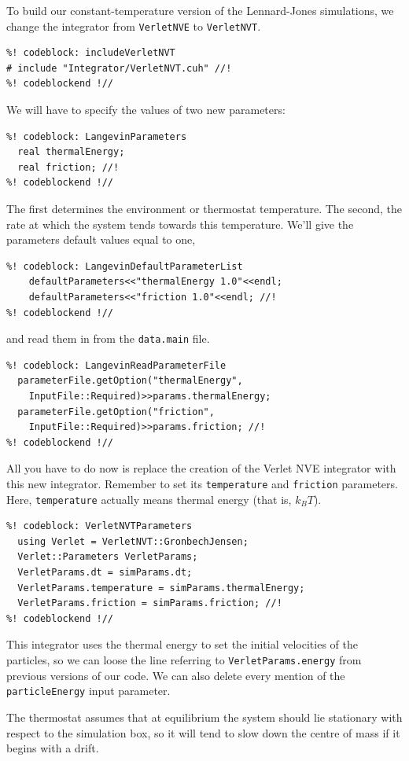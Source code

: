 To build our constant-temperature version of the Lennard-Jones simulations, we 
change the integrator from \texttt{VerletNVE} to \texttt{VerletNVT}.
\begin{lstlisting}
%! codeblock: includeVerletNVT
# include "Integrator/VerletNVT.cuh" //!
%! codeblockend !//
\end{lstlisting}
We will have to specify the values of two new parameters:
\begin{lstlisting}
%! codeblock: LangevinParameters
  real thermalEnergy;
  real friction; //!
%! codeblockend !//
\end{lstlisting}
The first determines the environment or thermostat temperature. The second, 
the rate at which the system tends towards this temperature. We'll give the 
parameters default values equal to one,
\begin{lstlisting}
%! codeblock: LangevinDefaultParameterList
    defaultParameters<<"thermalEnergy 1.0"<<endl;
    defaultParameters<<"friction 1.0"<<endl; //!
%! codeblockend !//
\end{lstlisting}
and read them in from the \texttt{data.main} file.
\begin{lstlisting}
%! codeblock: LangevinReadParameterFile
  parameterFile.getOption("thermalEnergy",
    InputFile::Required)>>params.thermalEnergy;
  parameterFile.getOption("friction",
    InputFile::Required)>>params.friction; //!
%! codeblockend !//
\end{lstlisting}

All you have to do now is replace the creation of the Verlet NVE integrator with 
this new integrator. Remember to set its \texttt{temperature} and 
\texttt{friction} parameters. Here, \texttt{temperature} actually means thermal 
energy (that is, $k_BT$).
\begin{lstlisting}
%! codeblock: VerletNVTParameters
  using Verlet = VerletNVT::GronbechJensen;
  Verlet::Parameters VerletParams;
  VerletParams.dt = simParams.dt;
  VerletParams.temperature = simParams.thermalEnergy;
  VerletParams.friction = simParams.friction; //!
%! codeblockend !//
\end{lstlisting}
This integrator uses the thermal energy to set the initial velocities of the 
particles, so we can loose the line referring to \texttt{VerletParams.energy} 
from previous versions of our code. We can also delete every mention of the 
\texttt{particleEnergy} input parameter.

The thermostat assumes that at equilibrium the system should lie stationary with 
respect to the simulation box, so it will tend to slow down the centre of mass 
if it begins with a drift.

